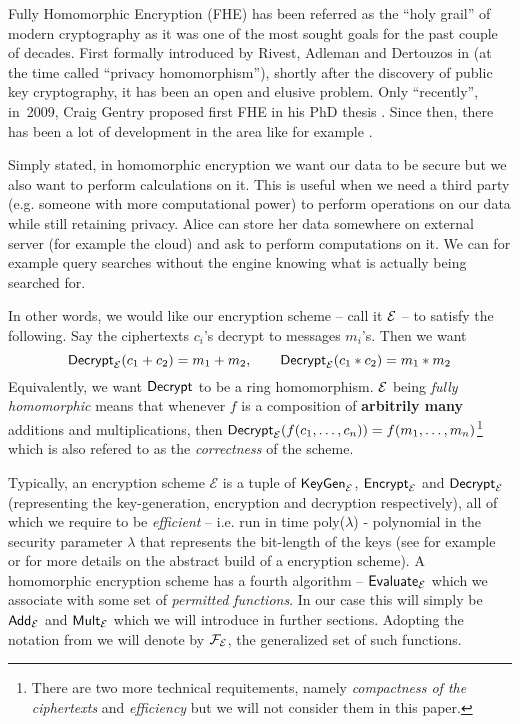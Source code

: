 Fully Homomorphic Encryption (FHE) has been referred as the ``holy grail'' of modern cryptography as it was one of the most sought goals for the past couple of decades. First formally introduced by Rivest, Adleman and Dertouzos in \cite{primal} (at the time called ``privacy homomorphism''), shortly after the discovery of public key cryptography, it has been an open and elusive problem. Only ``recently'', in~2009, Craig Gentry proposed first FHE in his PhD thesis \cite{gentry_phd}. Since then, there has been a lot of development in the area like for example \cite{worst-case, fhe-lwe, 6108154}.

Simply stated, in homomorphic encryption we want our data to be secure but we also want to perform calculations on it. This is useful when we need a third party (e.g. someone with more computational power) to perform operations on our data while still retaining privacy. Alice can store her data somewhere on external server (for example the cloud) and ask to perform computations on it. We can for example query searches without the engine knowing what is actually being searched for.

In other words, we would like our encryption scheme -- call it $\mathcal{E}$ -- to satisfy the following. Say the ciphertexts $c_i$'s decrypt to messages $m_i$'s. Then we want
\[ \textsf{Decrypt}_{\mathcal{E}}(c_1 + c_2) = m_1 + m_2, \qquad \textsf{Decrypt}_{\mathcal{E}}(c_1*c_2) = m_1*m_2 \]
Equivalently, we want $\textsf{Decrypt}$ to be a ring homomorphism. $\mathcal{E}$ being \textit{fully homomorphic} means that whenever $f$ is a composition of \textbf{arbitrily many} additions and multiplications, then $\textsf{Decrypt}_{\mathcal{E}}(f(c_1, \dots, c_n)) = f(m_1, \dots, m_n)$\footnote{There are two more technical requitements, namely \textit{compactness of the ciphertexts} and \textit{efficiency} but we will not consider them in this paper.} which is also refered to as the \textit{correctness} of the scheme.

\begin{remark} \label{algs}
    Typically, an encryption scheme $\mathcal{E}$ is a tuple of $\textsf{KeyGen}_{\mathcal{E}}$, $\textsf{Encrypt}_{\mathcal{E}}$ and $\textsf{Decrypt}_{\mathcal{E}}$ (representing the key-generation, encryption and decryption respectively), all of which we require to be \textit{efficient} -- i.e. run in time poly($\lambda$) - polynomial in the security parameter $\lambda$ that represents the bit-length of the keys (see for example \cite{katz} or \cite{book} for more details on the abstract build of a encryption scheme). A homomorphic encryption scheme has a fourth algorithm -- $\textsf{Evaluate}_{\mathcal{E}}$ which we associate with some set of \textit{permitted functions}. In our case this will simply be $\textsf{Add}_{\mathcal{E}}$ and $\textsf{Mult}_{\mathcal{E}}$ which we will introduce in further sections. Adopting the notation from \cite{easy_fhe} we will denote by $\mathcal{F}_{\mathcal{E}}$, the generalized set of such functions.
\end{remark}

